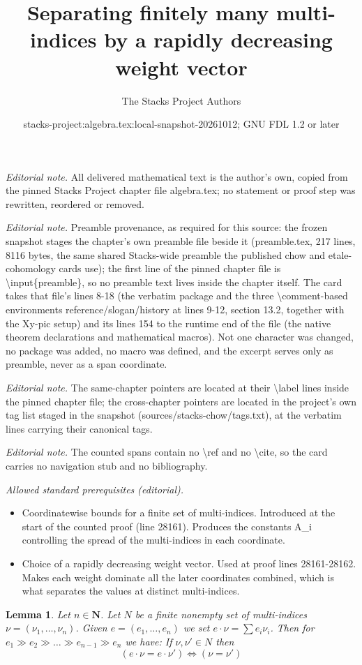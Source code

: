 \documentclass[10pt,a4paper]{amsart}
\title{Separating finitely many multi-indices by a rapidly decreasing weight vector}
\author{The Stacks Project Authors}
\date{stacks-project:algebra.tex:local-snapshot-20261012; GNU FDL 1.2 or later}
\theoremstyle{plain}
\newtheorem{lemma}[subsection]{Lemma}
\theoremstyle{definition}
\theoremstyle{remark}
\numberwithin{equation}{subsection}
\begin{document}
\maketitle
\noindent\textit{Editorial note.} All delivered mathematical text is the author's own, copied from the pinned Stacks Project chapter file algebra.tex; no statement or proof step was rewritten, reordered or removed.\par\medskip
\noindent\textit{Editorial note.} Preamble provenance, as required for this source: the frozen snapshot stages the chapter's own preamble file beside it (preamble.tex, 217 lines, 8116 bytes, the same shared Stacks-wide preamble the published chow and etale-cohomology cards use); the first line of the pinned chapter file is \textbackslash{}input\{preamble\}, so no preamble text lives inside the chapter itself. The card takes that file's lines 8-18 (the verbatim package and the three \textbackslash{}comment-based environments reference/slogan/history at lines 9-12, section 13.2, together with the Xy-pic setup) and its lines 154 to the runtime end of the file (the native theorem declarations and mathematical macros). Not one character was changed, no package was added, no macro was defined, and the excerpt serves only as preamble, never as a span coordinate.\par\medskip
\noindent\textit{Editorial note.} The same-chapter pointers are located at their \textbackslash{}label lines inside the pinned chapter file; the cross-chapter pointers are located in the project's own tag list staged in the snapshot (sources/stacks-chow/tags.txt), at the verbatim lines carrying their canonical tags.\par\medskip
\noindent\textit{Editorial note.} The counted spans contain no \textbackslash{}ref and no \textbackslash{}cite, so the card carries no navigation stub and no bibliography.\par\medskip
\noindent\textit{Allowed standard prerequisites (editorial).}\begin{itemize}
\item Coordinatewise bounds for a finite set of multi-indices. Introduced at the start of the counted proof (line 28161). Produces the constants A\_i controlling the spread of the multi-indices in each coordinate.
\item Choice of a rapidly decreasing weight vector. Used at proof lines 28161-28162. Makes each weight dominate all the later coordinates combined, which is what separates the values at distinct multi-indices.
\end{itemize}\medskip
\begin{lemma}
\label{lemma-helper}
Let $n \in \mathbf{N}$.
Let $N$ be a finite nonempty
set of multi-indices $\nu = (\nu_1, \ldots, \nu_n)$.
Given $e = (e_1, \ldots, e_n)$ we set $e \cdot \nu = \sum e_i\nu_i$.
Then for $e_1 \gg e_2 \gg \ldots \gg e_{n-1} \gg e_n$ we have:
If $\nu, \nu' \in N$ then
$$
(e \cdot \nu = e \cdot \nu')
\Leftrightarrow
(\nu = \nu')
$$
\end{lemma}
\end{document}

